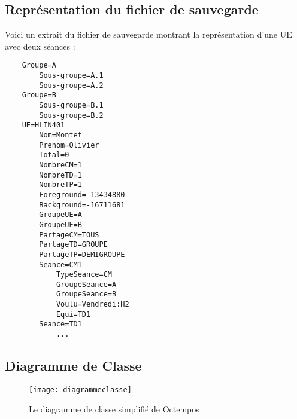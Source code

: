 \documentclass[12pt,a4paper]{article}
\begin{document}
\newpage
\subsection{Représentation du fichier de sauvegarde}
\label{save}
Voici un extrait du fichier de sauvegarde montrant la représentation d'une UE avec deux séances :

\begin{verbatim}
    Groupe=A
        Sous-groupe=A.1
        Sous-groupe=A.2
    Groupe=B
        Sous-groupe=B.1
        Sous-groupe=B.2
    UE=HLIN401
        Nom=Montet 
        Prenom=Olivier
        Total=0
        NombreCM=1
        NombreTD=1
        NombreTP=1
        Foreground=-13434880
        Background=-16711681
        GroupeUE=A
        GroupeUE=B
        PartageCM=TOUS
        PartageTD=GROUPE
        PartageTP=DEMIGROUPE
        Seance=CM1
            TypeSeance=CM
            GroupeSeance=A
            GroupeSeance=B
            Voulu=Vendredi:H2
            Equi=TD1
        Seance=TD1
            ...
\end{verbatim}

\newpage
\subsection{Diagramme de Classe}

\begin{figure}[h]
    \centering
    \label{diagrammeclasse}
    \texttt{[image: diagrammeclasse]}
    \caption{Le diagramme de classe simplifié de Octempos}
\end{figure}
\end{document}
